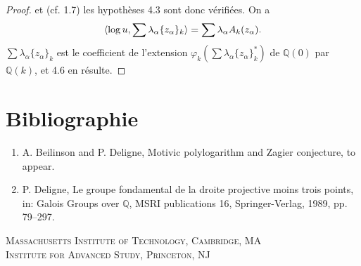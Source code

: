 \documentclass[12pt,a4paper]{article}
\theoremstyle{plain}
\theoremstyle{definition}
\theoremstyle{remark}
\newcommand{\Q}{\mathbb{Q}}
\begin{document}
\begin{proof}
et (cf. 1.7) les hypoth\`eses 4.3 sont donc v\'erifi\'ees. On a
\begin{equation*}
\langle\log u,\sum\lambda_\alpha\{z_\alpha\}_k\rangle = \sum\lambda_\alpha A_k(z_\alpha).\qedhere
\end{equation*}
$\sum\lambda_\alpha\{z_\alpha\}_k$ est le coefficient de l'extension $\varphi_k(\sum\lambda_\alpha\{z_\alpha\}_k^*)$ de $\Q(0)$ par $\Q(k)$, et 4.6 en r\'esulte.
\end{proof}

\section*{Bibliographie}

\begin{enumerate}
\item[{[BD]}] A. Beilinson and P. Deligne, Motivic polylogarithm and Zagier conjecture, to appear.
\item[{[D]}] P. Deligne, Le groupe fondamental de la droite projective moins trois points, in: Galois Groups over $\Q$, MSRI publications 16, Springer-Verlag, 1989, pp. 79--297.
\end{enumerate}

\vspace{1cm}
\begin{flushleft}
\textsc{Massachusetts Institute of Technology, Cambridge, MA}\\
\textsc{Institute for Advanced Study, Princeton, NJ}
\end{flushleft}
\end{document}
